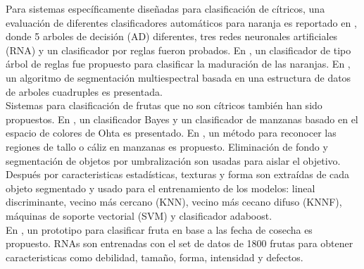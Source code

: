 \documentclass[twoside,spanish,ESP,MSc]{plantillaLabUPV}
\theoremstyle{definition}
\begin{document}
Para sistemas específicamente diseñadas para clasificación de cítricos, una evaluación de diferentes clasificadores automáticos para naranja es reportado en \cite{Mercol2008AutomaticCO}, donde 5 arboles de decisión (AD) diferentes, tres redes neuronales artificiales (RNA) y un clasificador por reglas fueron probados. En \cite{sirisath}, un clasificador de tipo árbol de reglas fue propuesto para clasificar la maduración de las naranjas. En \cite{Martinez-Uso:2005:MIS:1565835.1565847}, un algoritmo de segmentación multiespectral basada en una estructura de datos de arboles cuadruples es presentada. \\

Sistemas para clasificación de frutas que no son cítricos también han sido propuestos. En \cite{feng}, un clasificador Bayes y un clasificador de manzanas basado en el espacio de colores de Ohta es presentado. En \cite{UNAY2007597}, un método para reconocer las regiones de tallo o cáliz en manzanas es propuesto. Eliminación de fondo y segmentación de objetos por umbralización son usadas para aislar el objetivo. Después por caracteristicas estadísticas, texturas y forma son extraídas de cada objeto segmentado y usado para el entrenamiento de los modelos: lineal discriminante, vecino más cercano (KNN), vecino más cecano difuso (KNNF), máquinas de soporte vectorial (SVM) y clasificador adaboost.\\

En \cite{ALOHALI201129}, un prototipo para clasificar fruta en base a las fecha de cosecha es propuesto. RNAs son entrenadas con el set de datos de 1800 frutas para obtener caracteristicas como debilidad, tamaño, forma, intensidad y defectos.\\
\end{document}
